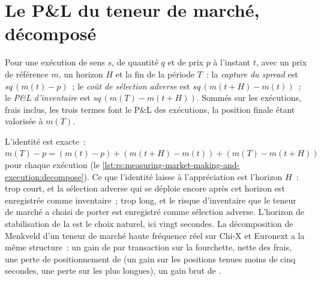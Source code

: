 \section{Le P\&L du teneur de marché, décomposé}

\begin{definition}\label{def:rs:measuring-market-making-and-execution:pnl}
Pour une exécution de sens $s$, de quantité $q$ et de prix $p$ à l'instant $t$, avec un prix de référence $m$, un horizon $H$ et la fin de la période $T$~: la \emph{capture du
spread} est $sq\,(m(t) - p)$~; le \emph{coût de sélection adverse} est $sq\,(m(t + H) - m(t))$~; le \emph{P\&L
d'inventaire} est $sq\,(m(T) - m(t + H))$. Sommés sur les exécutions, frais inclus, les trois termes font le P\&L des exécutions, la position finale étant valorisée à
$m(T)$.
\end{definition}

L'identité est exacte~: $m(T) - p = (m(t) - p) + (m(t+H) - m(t)) + (m(T) - m(t+H))$ pour chaque exécution (le \cref{lst:rs:measuring-market-making-and-execution:decompose}).
Ce que l'identité laisse à l'appréciation est l'horizon $H$~: trop court, et la sélection adverse qui se déploie encore après cet horizon est enregistrée comme inventaire~; trop long, et le risque d'inventaire
que le teneur de marché a choisi de porter est enregistré comme sélection adverse. L'horizon de stabilisation de la  est le choix naturel, ici vingt secondes.
La décomposition de Menkveld d'un teneur de marché haute fréquence réel sur Chi-X et Euronext a la même structure~: un gain de  par transaction sur la fourchette, nette
des frais, une perte de positionnement de  (un gain sur les positions tenues moins de cinq secondes, une perte sur les plus longues), un gain brut de .

